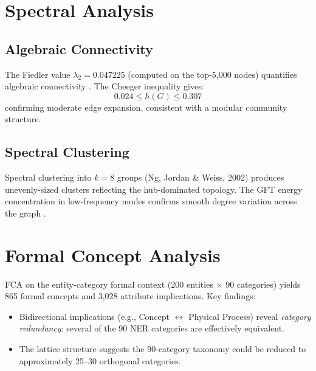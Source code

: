 \documentclass[11pt,a4paper]{article}
\begin{document}
\section{Spectral Analysis}

\subsection{Algebraic Connectivity}

The Fiedler value $\lambda_2 = 0.047225$ (computed on the top-5,000 nodes) quantifies algebraic connectivity \citep{fiedler1973}.  The Cheeger inequality gives:
\begin{equation}
  0.024 \leq h(G) \leq 0.307
\end{equation}
confirming moderate edge expansion, consistent with a modular community structure.

\subsection{Spectral Clustering}

Spectral clustering into $k=8$ groups (Ng, Jordan \& Weiss, 2002) produces unevenly-sized clusters reflecting the hub-dominated topology.  The GFT energy concentration in low-frequency modes confirms smooth degree variation across the graph \citep{shuman2013}.

\section{Formal Concept Analysis}

FCA \citep{ganter1999} on the entity-category formal context (200 entities $\times$ 90 categories) yields 865 formal concepts and 3,028 attribute implications.  Key findings:

\begin{itemize}
  \item Bidirectional implications (e.g., Concept $\leftrightarrow$ Physical Process) reveal \emph{category redundancy}: several of the 90 NER categories are effectively equivalent.
  \item The lattice structure suggests the 90-category taxonomy could be reduced to approximately 25--30 orthogonal categories.
\end{itemize}
\end{document}

